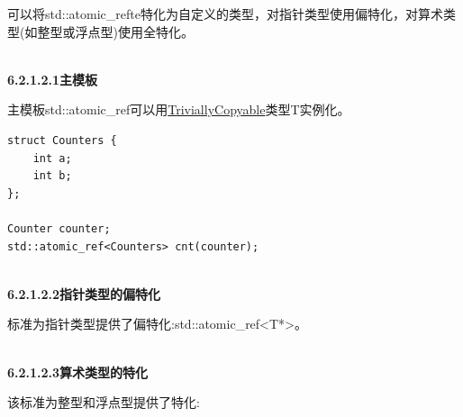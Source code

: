 可以将std::atomic\_refte特化为自定义的类型，对指针类型使用偏特化，对算术类型(如整型或浮点型)使用全特化。

\hspace*{\fill} \\ %
\noindent
\textbf{6.2.1.2.1\hspace{0.2cm}主模板}

主模板std::atomic\_ref可以用\href{https://en.cppreference.com/w/cpp/types/is_trivially_copyable}{TriviallyCopyable}类型T实例化。

\begin{lstlisting}[style=styleCXX]
struct Counters {
	int a;
	int b;
};

Counter counter;
std::atomic_ref<Counters> cnt(counter);
\end{lstlisting}

\hspace*{\fill} \\ %
\noindent
\textbf{6.2.1.2.2\hspace{0.2cm}指针类型的偏特化}

标准为指针类型提供了偏特化:std::atomic\_ref<T*>。

\hspace*{\fill} \\ %
\noindent
\textbf{6.2.1.2.3\hspace{0.2cm}算术类型的特化}

该标准为整型和浮点型提供了特化:

